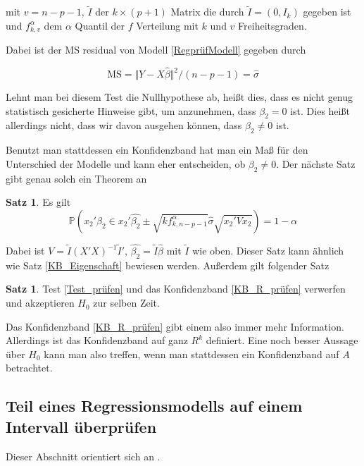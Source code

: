 \documentclass[12pt,a4paper]{article}
\theoremstyle{definition}
\theoremstyle{definition}
\newtheorem{Satz}[Definition]{Satz}
\theoremstyle{definition}
\begin{document}
mit $v=n-p-1$, $\tilde{I}$ der $k \times (p+1)$ Matrix die durch $\tilde{I}=(0,I_k)$ gegeben ist und $f^{\alpha}_{k,v}$ dem $\alpha$ Quantil der $f$ Verteilung mit $k$ und $v$ Freiheitsgraden.

Dabei ist der MS residual von Modell \eqref{RegprüfModell} gegeben durch

\begin{equation*}
\text{MS} = \Vert Y - X\hat{\beta} \Vert^2 / (n-p-1) = \hat{\sigma}
\end{equation*}

Lehnt man bei diesem Test die Nullhypothese ab, heißt dies, dass es nicht genug statistisch gesicherte Hinweise gibt, um anzunehmen, dass $\beta_{2} = 0$ ist. Dies heißt allerdings nicht, dass wir davon ausgehen können, dass $\beta_2 \neq 0$ ist. 

Benutzt man stattdessen ein Konfidenzband hat man ein Maß für den Unterschied der Modelle und kann eher entscheiden, ob $\beta_2 \neq 0$. Der nächste Satz gibt genau solch ein Theorem an

\begin{Satz}
Es gilt
\begin{equation} \label{KB_R_prüfen}
\mathbb{P}(x_2'\beta_2 \in x_2'\hat{\beta_2} \pm \sqrt{k f^{\alpha}_{k,n-p-1}} \hat{\sigma} \sqrt{x_2' V x_2}) = 1 - \alpha
\end{equation}
\end{Satz}

Dabei ist $V=\tilde{I}(X'X)^{-1}\tilde{I}'$, $\hat{\beta_2} = \tilde{I} \hat{\beta}$ mit $\tilde{I}$ wie oben. Dieser Satz kann ähnlich wie Satz \eqref{KB_Eigenschaft} bewiesen werden. Außerdem gilt folgender Satz

\begin{Satz}
Test \eqref{Test_prüfen} und das Konfidenzband \eqref{KB_R_prüfen} verwerfen und akzeptieren $H_0$ zur selben Zeit.
\end{Satz}

Das Konfidenzband \eqref{KB_R_prüfen} gibt einem also immer mehr Information. Allerdings ist das Konfidenzband auf ganz $R^k$ definiert. Eine noch besser Aussage über $H_0$ kann man also treffen, wenn man stattdessen ein Konfidenzband auf $A$ betrachtet. 

\subsection{Teil eines Regressionsmodells auf einem Intervall überprüfen}
\label{Teil eines Regressionsmodells auf einem Intervall überpruefen}
Dieser Abschnitt orientiert sich an \cite[102-105]{Liu64}.
\end{document}
